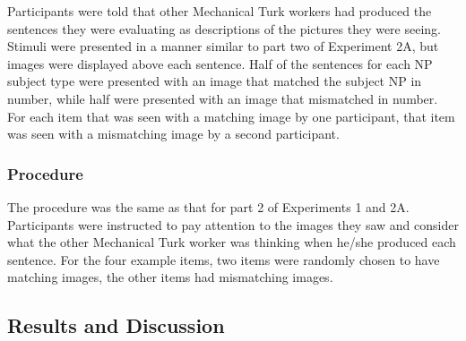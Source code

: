 \documentclass[10pt,letterpaper]{article}
\begin{document}
Participants were told that other Mechanical Turk workers had produced the sentences they were evaluating as descriptions of the pictures they were seeing. Stimuli were presented in a manner similar to part two of Experiment 2A, but images were displayed above each sentence. Half of the sentences for each NP subject type were presented with an image that matched the subject NP in number, while half were presented with an image that mismatched in number. For each item that was seen with a matching image by one participant, that item was seen with a mismatching image by a second participant. 

\subsubsection{Procedure}

The procedure was the same as that for part 2 of Experiments 1 and 2A. Participants were instructed to pay attention to the images they saw and consider what the other Mechanical Turk worker was thinking when he/she produced each sentence. For the four example items, two items were randomly chosen to have matching images, the other items had mismatching images. 


\subsection{Results and Discussion}
\end{document}
